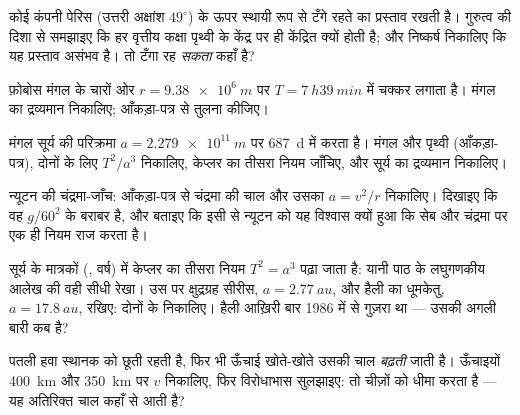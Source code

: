 \begin{exercise}[$\star\star$]\label{exo:g12:satellites-kepler:7}
कोई कंपनी पेरिस (उत्तरी अक्षांश $49^\circ$) के ऊपर स्थायी रूप से टँगे रहते
 का प्रस्ताव रखती है। गुरुत्व की दिशा से समझाइए कि हर वृत्तीय
कक्षा पृथ्वी के केंद्र पर ही केंद्रित क्यों होती है; और निष्कर्ष
निकालिए कि यह प्रस्ताव असंभव है। तो  टँगा रह \emph{सकता} कहाँ
है?
\end{exercise}

\begin{exercise}[$\star\star$]\label{exo:g12:satellites-kepler:8}
फ़ोबोस मंगल के चारों ओर $r = \qty{9.38e6}{m}$ पर $T = \qty{7}{h}
\qty{39}{min}$ में चक्कर लगाता है। मंगल का
द्रव्यमान निकालिए; आँकड़ा-पत्र से तुलना कीजिए।
\end{exercise}

\begin{exercise}[$\star\star$]\label{exo:g12:satellites-kepler:9}
मंगल सूर्य की परिक्रमा $a = \qty{2.279e11}{m}$ पर \qty{687}{d} में करता है। मंगल और
पृथ्वी (आँकड़ा-पत्र), दोनों के लिए $T^2/a^3$ निकालिए, केप्लर का तीसरा नियम जाँचिए,
और सूर्य का द्रव्यमान निकालिए।
\end{exercise}

\begin{exercise}[$\star\star$]\label{exo:g12:satellites-kepler:10}
न्यूटन की चंद्रमा-जाँच: आँकड़ा-पत्र से चंद्रमा की चाल और उसका  $a = v^2/r$ निकालिए। दिखाइए कि वह $g/60^2$ के बराबर है, और बताइए कि इसी से
न्यूटन को यह विश्वास क्यों हुआ कि सेब और चंद्रमा पर एक ही नियम राज करता है।
\end{exercise}

\begin{exercise}[$\star\star$]\label{exo:g12:satellites-kepler:11}
सूर्य के मात्रकों (, वर्ष) में केप्लर का तीसरा
नियम $T^2 = a^3$ पढ़ा जाता है: यानी पाठ के लघुगणकीय आलेख की वही सीधी रेखा। उस पर
क्षुद्रग्रह सीरीस, $a = \qty{2.77}{au}$, और हैली का धूमकेतु, $a = \qty{17.8}{au}$, रखिए: दोनों के
 निकालिए। हैली आख़िरी बार 1986 में  से गुज़रा
था --- उसकी अगली बारी कब है?
\end{exercise}

\begin{exercise}[$\star\star\star$]\label{exo:g12:satellites-kepler:12}
पतली हवा स्थानक को छूती रहती है, फिर भी ऊँचाई खोते-खोते उसकी चाल
\emph{बढ़ती} जाती है। ऊँचाइयों \qty{400}{km} और \qty{350}{km} पर $v$ निकालिए, फिर
विरोधाभास सुलझाइए:  तो चीज़ों को धीमा करता है --- यह अतिरिक्त चाल
कहाँ से आती है?
\end{exercise}


